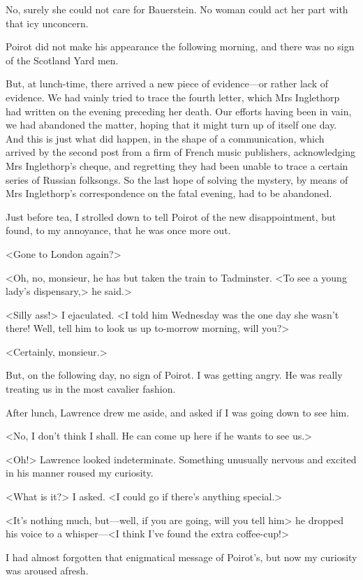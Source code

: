  No, surely she could not care for Bauerstein. No woman could act her part with that icy unconcern. 

 Poirot did not make his appearance the following morning, and there was no sign of the Scotland Yard men. 

 But, at lunch-time, there arrived a new piece of evidence—or rather lack of evidence. We had vainly tried to trace the fourth letter, which Mrs Inglethorp had written on the evening preceding her death. Our efforts having been in vain, we had abandoned the matter, hoping that it might turn up of itself one day. And this is just what did happen, in the shape of a communication, which arrived by the second post from a firm of French music publishers, acknowledging Mrs Inglethorp's cheque, and regretting they had been unable to trace a certain series of Russian folksongs. So the last hope of solving the mystery, by means of Mrs Inglethorp's correspondence on the fatal evening, had to be abandoned. 

 Just before tea, I strolled down to tell Poirot of the new disappointment, but found, to my annoyance, that he was once more out. 

 <Gone to London again?> 

 <Oh, no, monsieur, he has but taken the train to Tadminster. <To see a young lady's dispensary,> he said.> 

 <Silly ass!> I ejaculated. <I told him Wednesday was the one day she wasn't there! Well, tell him to look us up to-morrow morning, will you?> 

 <Certainly, monsieur.> 

 But, on the following day, no sign of Poirot. I was getting angry. He was really treating us in the most cavalier fashion. 

 After lunch, Lawrence drew me aside, and asked if I was going down to see him. 

 <No, I don't think I shall. He can come up here if he wants to see us.> 

 <Oh!> Lawrence looked indeterminate. Something unusually nervous and excited in his manner roused my curiosity. 

 <What is it?> I asked. <I could go if there's anything special.> 

 <It's nothing much, but—well, if you are going, will you tell him\longdash> he dropped his voice to a whisper—<I think I've found the extra coffee-cup!> 

 I had almost forgotten that enigmatical message of Poirot's, but now my curiosity was aroused afresh. 

